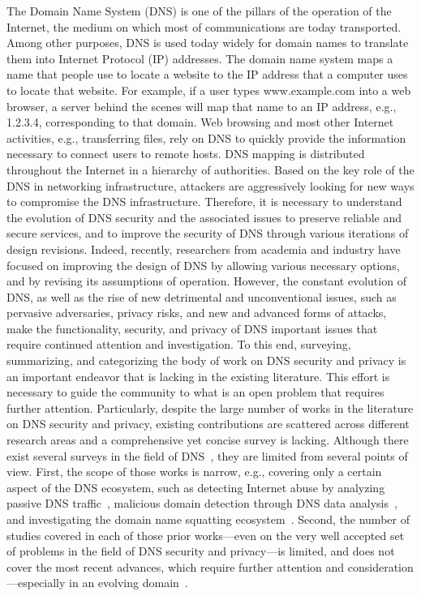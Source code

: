 

The Domain Name System (DNS) is one of the pillars of the operation of the Internet, the medium on which most of communications are today transported. Among other purposes, DNS is used today widely for domain names to translate them into Internet Protocol (IP) addresses. The domain name system maps a name that people use to locate a website to the IP address that a computer uses to locate that website. For example, if a user types www.example.com into a web browser, a server behind the scenes will map that name to an IP address, e.g., {1.2.3.4}, corresponding to that domain. Web browsing and most other Internet activities, e.g., transferring files, rely on DNS to quickly provide the information necessary to connect users to remote hosts. DNS mapping is distributed throughout the Internet in a hierarchy of authorities. 
Based on the key role of the DNS in networking infrastructure, attackers are aggressively looking for new ways to compromise the DNS infrastructure. Therefore, it is necessary to understand the evolution of DNS security and the associated issues to preserve reliable and secure services, and to improve the security of DNS through various iterations of design revisions. Indeed, recently, researchers from academia and industry have focused on improving the design of DNS by allowing various necessary options, and by revising its assumptions of operation. However, the constant evolution of DNS, as well as the rise of new detrimental and unconventional issues, such as pervasive adversaries, privacy risks, and new and advanced forms of attacks, make the functionality, security, and privacy of DNS important issues that require continued attention and investigation. To this end, surveying, summarizing, and categorizing the body of work on DNS security and privacy is an  important endeavor that is lacking in the existing literature. This effort is necessary to guide the community to what is an open problem that requires further attention. 
Particularly, despite the large number of works in the literature on DNS security and privacy, existing contributions are scattered across different research areas and a comprehensive yet concise survey is lacking. Although there exist several surveys in the field of DNS~, they are limited from several points of view. First, the scope of those works is narrow, e.g., covering only a certain aspect of the DNS ecosystem, such as detecting Internet abuse by analyzing passive DNS traffic~, malicious domain detection through DNS data analysis~, and investigating the domain name squatting ecosystem~. Second, the number of studies covered in each of those prior works---even on the very well accepted set of problems in the field of DNS security and privacy---is limited, and does not cover the most recent advances, which require further attention and consideration---especially in an evolving domain~. 
